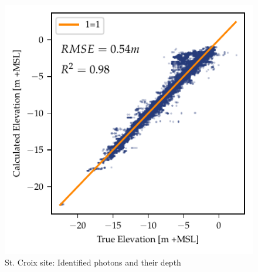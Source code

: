 \begin{figure}[htbp]
    \centering
    \includegraphics{figures/stcroix_lidar_estimated_vs_truth.pdf}
    \caption{St. Croix site: Identified photons and their depth}
    \label{fig:st-croix-bias-plot}
\end{figure}






